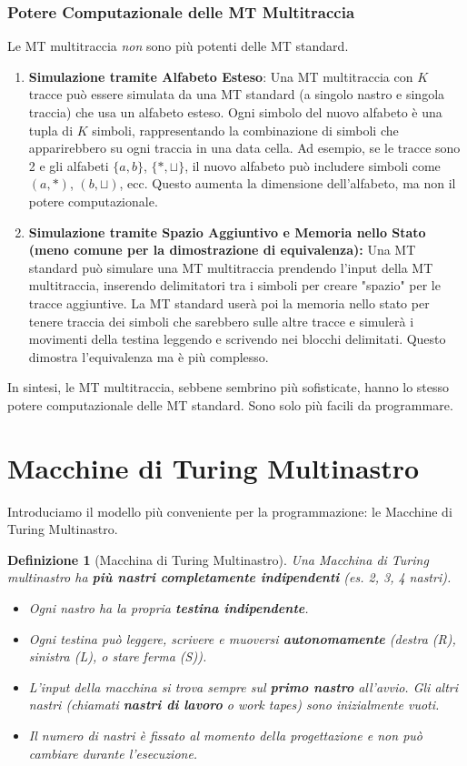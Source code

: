\documentclass[a4paper]{article}
\newtheorem{definition}{Definizione}
\begin{document}
\subsubsection{Potere Computazionale delle MT Multitraccia}
Le MT multitraccia \emph{non} sono più potenti delle MT standard.
\begin{enumerate}
    \item \textbf{Simulazione tramite Alfabeto Esteso}:
    Una MT multitraccia con $K$ tracce può essere simulata da una MT standard (a singolo nastro e singola traccia) che usa un alfabeto esteso. Ogni simbolo del nuovo alfabeto è una tupla di $K$ simboli, rappresentando la combinazione di simboli che apparirebbero su ogni traccia in una data cella. Ad esempio, se le tracce sono 2 e gli alfabeti $\{a,b\}$, $\{*, \sqcup\}$, il nuovo alfabeto può includere simboli come $(a, *)$, $(b, \sqcup)$, ecc. Questo aumenta la dimensione dell'alfabeto, ma non il potere computazionale.
    \item \textbf{Simulazione tramite Spazio Aggiuntivo e Memoria nello Stato (meno comune per la dimostrazione di equivalenza):}
    Una MT standard può simulare una MT multitraccia prendendo l'input della MT multitraccia, inserendo delimitatori tra i simboli per creare "spazio" per le tracce aggiuntive. La MT standard userà poi la memoria nello stato per tenere traccia dei simboli che sarebbero sulle altre tracce e simulerà i movimenti della testina leggendo e scrivendo nei blocchi delimitati. Questo dimostra l'equivalenza ma è più complesso.
\end{enumerate}
In sintesi, le MT multitraccia, sebbene sembrino più sofisticate, hanno lo stesso potere computazionale delle MT standard. Sono solo più facili da programmare.

\section{Macchine di Turing Multinastro}
Introduciamo il modello più conveniente per la programmazione: le Macchine di Turing Multinastro.

\begin{definition}[Macchina di Turing Multinastro]
Una Macchina di Turing multinastro ha \textbf{più nastri completamente indipendenti} (es. 2, 3, 4 nastri).
\begin{itemize}
    \item Ogni nastro ha la propria \textbf{testina indipendente}.
    \item Ogni testina può leggere, scrivere e muoversi \textbf{autonomamente} (destra (R), sinistra (L), o stare ferma (S)).
    \item L'input della macchina si trova sempre sul \textbf{primo nastro} all'avvio. Gli altri nastri (chiamati \textbf{nastri di lavoro} o \emph{work tapes}) sono inizialmente vuoti.
    \item Il numero di nastri è fissato al momento della progettazione e non può cambiare durante l'esecuzione.
\end{itemize}
\end{definition}
\end{document}
